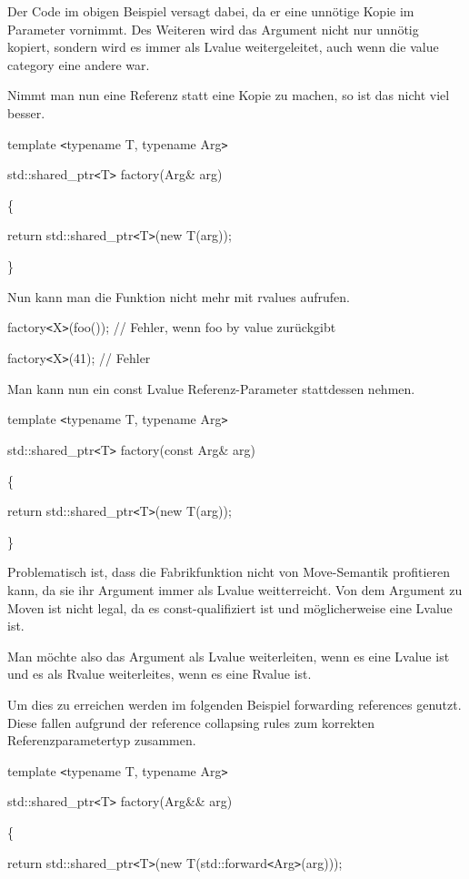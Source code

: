 \documentclass{article}
\begin{document}
Der Code im obigen Beispiel versagt dabei, da er eine unnötige Kopie im Parameter 
vornimmt. Des Weiteren wird das Argument nicht nur unnötig kopiert, sondern wird 
es immer als Lvalue weitergeleitet, auch wenn die value category eine andere war.

Nimmt man nun eine Referenz statt eine Kopie zu machen, so ist das nicht viel besser.

template \texttt{<}typename T, typename Arg\texttt{>}

std::shared\_ptr\texttt{<}T\texttt{>} factory(Arg\& arg)

\{    

\parindent=14pt
return std::shared\_ptr\texttt{<}T\texttt{>}(new T(arg));

\parindent=0pt
\}

Nun kann man die Funktion nicht mehr mit rvalues aufrufen.

factory\texttt{<}X\texttt{>}(foo()); // Fehler, wenn foo by value zurückgibt

factory\texttt{<}X\texttt{>}(41);    // Fehler

Man kann nun ein const Lvalue Referenz-Parameter stattdessen nehmen.

template \texttt{<}typename T, typename Arg\texttt{>}

std::shared\_ptr\texttt{<}T\texttt{>} factory(const Arg\& arg) 

\{    

\parindent=14pt
return std::shared\_ptr\texttt{<}T\texttt{>}(new T(arg));

\parindent=0pt
\}

Problematisch ist, dass die Fabrikfunktion nicht von Move-Semantik profitieren 
kann, da sie ihr Argument immer als Lvalue weitterreicht. Von dem Argument zu Moven 
ist nicht legal, da es const-qualifiziert ist und möglicherweise eine Lvalue ist.

Man möchte also das Argument als Lvalue weiterleiten, wenn es eine Lvalue ist 
und es als Rvalue weiterleites, wenn es eine Rvalue ist.

Um dies zu erreichen werden im folgenden Beispiel forwarding references genutzt. 
Diese fallen aufgrund der reference collapsing rules zum korrekten Referenzparametertyp 
zusammen.

template \texttt{<}typename T, typename Arg\texttt{>}

std::shared\_ptr\texttt{<}T\texttt{>} factory(Arg\&\& arg)

\{    

\parindent=14pt
return std::shared\_ptr\texttt{<}T\texttt{>}(new T(std::forward\texttt{<}Arg\texttt{>}(arg)));
\end{document}
